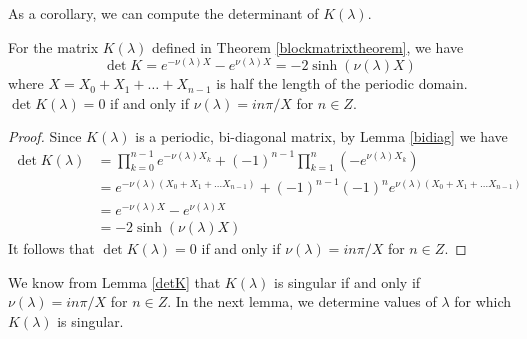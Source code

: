 \documentclass[thesis.tex]{subfiles}
\begin{document}
As a corollary, we can compute the determinant of $K(\lambda)$.


\begin{corollary}\label{detKcorr}
For the matrix $K(\lambda)$ defined in Theorem \ref{blockmatrixtheorem}, we have 
\begin{equation}\label{detK}
\det K = e^{-\nu(\lambda)X} - e^{\nu(\lambda)X} = -2 \sinh (\nu(\lambda) X)
\end{equation}
where $X = X_0 + X_1 + \dots + X_{n-1}$ is half the length of the periodic domain. $\det K(\lambda) = 0$ if and only if $\nu(\lambda) = i n \pi/X$ for $n \in Z$. 
\begin{proof}
Since $K(\lambda)$ is a periodic, bi-diagonal matrix, by Lemma \ref{bidiag} we have
\begin{align*}
\det K(\lambda) &= \prod_{k = 0}^{n-1} e^{-\nu(\lambda)X_k} + (-1)^{n-1} \prod_{k = 1}^n (-e^{\nu(\lambda)X_k}) \\
&= e^{-\nu(\lambda)(X_0 + X_1 + \dots X_{n-1})} + (-1)^{n-1} (-1)^n e^{\nu(\lambda)(X_0 + X_1 + \dots X_{n-1})} \\
&= e^{-\nu(\lambda)X} - e^{\nu(\lambda)X} \\
&= -2 \sinh (\nu(\lambda)X)
\end{align*}
It follows that $\det K(\lambda) = 0$ if and only if $\nu(\lambda) = i n \pi/X$ for $n \in Z$.
\end{proof}
\end{corollary}

We know from Lemma \ref{detK} that $K(\lambda)$ is singular if and only if $\nu(\lambda) = i n \pi/X$ for $n \in Z$. In the next lemma, we determine values of $\lambda$ for which $K(\lambda)$ is singular. 

\end{document}
